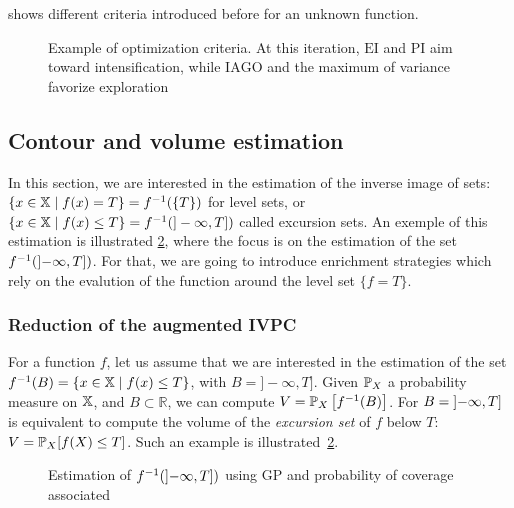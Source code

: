 \documentclass[../../Main_ManuscritThese.tex]{subfiles}
\newcommand\imgpath{/home/victor/acadwriting/Manuscrit/Text/Chapter4/img/}
\begin{document}
 shows different criteria introduced before for an unknown function.
\begin{figure}[ht!]
  \centering
  
  \caption[Optimization criteria for GP]{\label{fig:example_optimization_criteria} Example of optimization criteria. At this iteration, $\mathrm{EI}$ and $\mathrm{PI}$ aim toward intensification, while $\mathrm{IAGO}$ and the maximum of variance favorize exploration}
\end{figure}

%
\subsection{Contour and volume estimation}
\label{sec:GP_vol_estim}
In this section, we are interested in the estimation of the inverse image of sets: $\{x \in \mathbb{X} \mid f(x) = T\}=f^{-1}(\{T\})$ for level sets, or $\{x\in\mathbb{X} \mid f(x) \leq T\} = f^{-1}(]-\infty, T])$ called excursion sets. An exemple of this estimation is illustrated \cref{fig:prob_coverage_example}, where the focus is on the estimation of the set $f^{-1}(\interval[open left]{-\infty}{T})$. For that, we are going to introduce enrichment strategies which rely on the evalution of the function around the level set $\{f=T\}$.

\subsubsection{Reduction of the augmented IVPC}
For a function $f$, let us assume that we are interested in the
estimation of the set
$f^{-1}(B) = \{x \in \mathbb{X} \mid f(x) \leq T\}$, with
$B = ]-\infty, T]$. Given $\mathbb{P}_{X}$ a probability
measure on $\mathbb{X}$, and $B\subset \mathbb{R}$, we can compute
$V=\mathbb{P}_{X}\left[f^{-1}(B)\right]$. For
$B = \interval[open left]{-\infty}{T}$ is equivalent to compute the
volume of the \emph{excursion set} of $f$ below $T$:
$V=\mathbb{P}_{X}[f(X) \leq T]$. Such an example is illustrated~\cref{fig:prob_coverage_example}.%
\begin{figure}[ht]
  \centering
  
  \caption{\label{fig:prob_coverage_example} Estimation of $f^{-1}(\interval[open left]{-\infty}{T})$ using GP and probability of coverage associated }
\end{figure}
\end{document}
